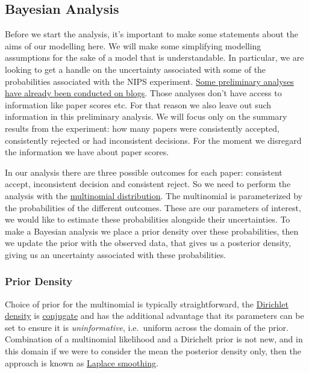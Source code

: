 \hypertarget{bayesian-analysis}{%
\subsection{Bayesian Analysis}\label{bayesian-analysis}}

Before we start the analysis, it's important to make some statements
about the aims of our modelling here. We will make some simplifying
modelling assumptions for the sake of a model that is understandable. In
particular, we are looking to get a handle on the uncertainty associated
with some of the probabilities associated with the NIPS experiment.
\href{http://inverseprobability.com/2015/01/16/blogs-on-the-nips-experiment/}{Some
preliminary analyses have already been conducted on blogs}. Those
analyses don't have access to information like paper scores etc. For
that reason we also leave out such information in this preliminary
analysis. We will focus only on the summary results from the experiment:
how many papers were consistently accepted, consistently rejected or had
inconsistent decisions. For the moment we disregard the information we
have about paper scores.

In our analysis there are three possible outcomes for each paper:
consistent accept, inconsistent decision and consistent reject. So we
need to perform the analysis with the
\href{http://en.wikipedia.org/wiki/Multinomial_distribution}{multinomial
distribution}. The multinomial is parameterized by the probabilities of
the different outcomes. These are our parameters of interest, we would
like to estimate these probabilities alongside their uncertainties. To
make a Bayesian analysis we place a prior density over these
probabilities, then we update the prior with the observed data, that
gives us a posterior density, giving us an uncertainty associated with
these probabilities.

\hypertarget{prior-density}{%
\subsubsection{Prior Density}\label{prior-density}}

Choice of prior for the multinomial is typically straightforward, the
\href{http://en.wikipedia.org/wiki/Dirichlet_distribution}{Dirichlet
density} is
\href{http://en.wikipedia.org/wiki/Conjugate_prior}{conjugate} and has
the additional advantage that its parameters can be set to ensure it is
\emph{uninformative}, i.e.~uniform across the domain of the prior.
Combination of a multinomial likelihood and a Dirichelt prior is not
new, and in this domain if we were to consider the mean the posterior
density only, then the approach is known as
\href{http://en.wikipedia.org/wiki/Additive_smoothing}{Laplace
smoothing}.

